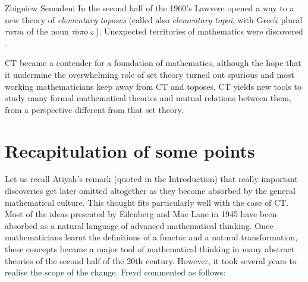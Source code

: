 \begin{artengenv}{Zbigniew Semadeni}
In the second half of the 1960's Lawvere opened a way to a new theory of \textit{elementary 
toposes} (called also \textit{elementary topoi}, with Greek plural 
$\tau{\acute{o}}\pi o\iota$ of the noun $\tau{\acute{o}}\pi o\varsigma$). 
Unexpected territories of mathematics were discovered \parencites[][]{Law-Toposes}[][pp.352--359]{Century}[][]{Kromer}. 

CT became a contender for a foundation of mathematics, although the hope that it 
undermine the overwhelming role of set theory turned out spurious and most 
working mathematicians keep away from CT and toposes. CT yields new tools to study 
many formal mathematical theories and mutual relations between them, from a 
perspective different from that set theory.  

\section{Recapitulation of some points}  
Let us recall Atiyah's remark (quoted in the Introduction) that really important 
discoveries get later omitted altogether as they become absorbed by the general 
mathematical culture. This thought fits particularly well with the case of CT. Most 
of the ideas presented by Eilenberg and Mac Lane in 1945 have been absorbed as a 
natural language of advanced mathematical thinking. Once mathematicians learnt the 
definitions of a functor and a natural transformation, these concepts became a 
major tool of mathematical thinking in many abstract theories of the second half 
of the 20th century. However, it took several years to realise the scope of the 
change. Freyd commented as follows: 



\end{artengenv}
